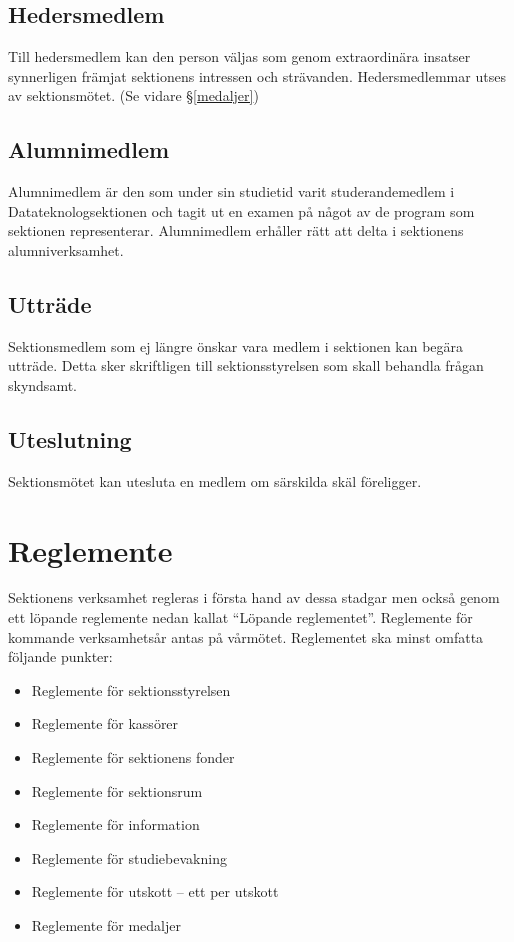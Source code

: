 \documentclass{datateknologsektionen-document}
\begin{document}
\subsection{Hedersmedlem}
Till hedersmedlem kan den person väljas som genom extraordinära insatser synnerligen
främjat sektionens intressen och strävanden. Hedersmedlemmar utses av
sektionsmötet. (Se vidare \S \ref{medaljer})

\subsection{Alumnimedlem}
Alumnimedlem är den som under sin studietid varit studerandemedlem i
Datateknologsektionen och tagit ut en examen på något av de program som sektionen
representerar. Alumnimedlem erhåller rätt att delta i sektionens alumniverksamhet.
\subsection{Utträde}
Sektionsmedlem som ej längre önskar vara medlem i sektionen kan begära utträde.
Detta sker skriftligen till sektionsstyrelsen som skall behandla frågan skyndsamt.
\subsection{Uteslutning}
Sektionsmötet kan utesluta en medlem om särskilda skäl föreligger.
\section{Reglemente}
Sektionens verksamhet regleras i första hand av dessa stadgar men också genom ett
löpande reglemente nedan kallat ``Löpande reglementet''. Reglemente för kommande
verksamhetsår antas på vårmötet. Reglementet ska minst omfatta följande punkter:
\begin{itemize}
  \item Reglemente för sektionsstyrelsen
  \item Reglemente för kassörer
  \item Reglemente för sektionens fonder
  \item Reglemente för sektionsrum
  \item Reglemente för information
  \item Reglemente för studiebevakning
  \item Reglemente för utskott – ett per utskott
  \item Reglemente för medaljer
\end{itemize}
\end{document}
